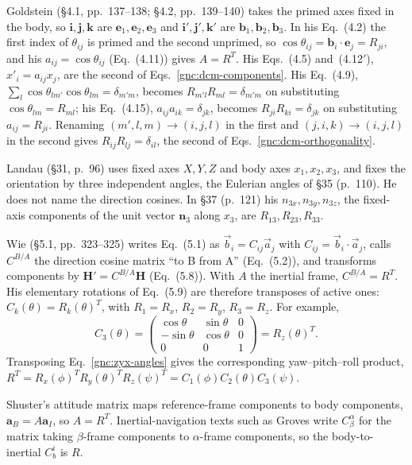 Goldstein (\S4.1, pp.~137--138; \S4.2, pp.~139--140) takes the primed
axes fixed in the body, so $\mathbf i,\mathbf j,\mathbf k$ are
$\mathbf e_1,\mathbf e_2,\mathbf e_3$ and $\mathbf i',\mathbf j',\mathbf k'$
are $\mathbf b_1,\mathbf b_2,\mathbf b_3$. In his Eq.~(4.2) the first index
of $\theta_{ij}$ is primed and the second unprimed, so
$\cos\theta_{ij}=\mathbf b_i\cdot\mathbf e_j=R_{ji}$, and his
$a_{ij}=\cos\theta_{ij}$ (Eq.~(4.11)) gives $A=R^T$. His
Eqs.~(4.5) and~(4.12$'$), $x'_i=a_{ij}x_j$, are the second of
Eqs.~\eqref{gnc:dcm-components}. His Eq.~(4.9),
$\sum_l\cos\theta_{lm'}\cos\theta_{lm}=\delta_{m'm}$, becomes
$R_{m'l}R_{ml}=\delta_{m'm}$ on substituting $\cos\theta_{lm}=R_{ml}$; his
Eq.~(4.15), $a_{ij}a_{ik}=\delta_{jk}$, becomes
$R_{ji}R_{ki}=\delta_{jk}$ on substituting $a_{ij}=R_{ji}$. Renaming
$(m',l,m)\to(i,j,l)$ in the first and $(j,i,k)\to(i,j,l)$ in the second
gives $R_{ij}R_{lj}=\delta_{il}$, the second of
Eqs.~\eqref{gnc:dcm-orthogonality}.

Landau (\S31, p.~96) uses fixed axes $X,Y,Z$ and body axes $x_1,x_2,x_3$,
and fixes the orientation by three independent angles, the Eulerian
angles of \S35 (p.~110). He does not name the direction cosines. In \S37
(p.~121) his $n_{3x},n_{3y},n_{3z}$, the fixed-axis components of the unit
vector $\mathbf n_3$ along $x_3$, are $R_{13},R_{23},R_{33}$.

Wie (\S5.1, pp.~323--325) writes Eq.~(5.1) as $\vec b_i=C_{ij}\vec a_j$
with $C_{ij}=\vec b_i\cdot\vec a_j$, calls $C^{B/A}$ the direction cosine
matrix ``to B from A'' (Eq.~(5.2)), and transforms components by
$\mathbf H'=C^{B/A}\mathbf H$ (Eq.~(5.8)). With $A$ the inertial frame,
$C^{B/A}=R^T$. His elementary rotations of Eq.~(5.9) are therefore
transposes of active ones: $C_k(\theta)=R_k(\theta)^T$, with
$R_1=R_x$, $R_2=R_y$, $R_3=R_z$. For example,
\[
 C_3(\theta)=
 \begin{pmatrix}\cos\theta&\sin\theta&0\\-\sin\theta&\cos\theta&0\\0&0&1
 \end{pmatrix}
 =R_z(\theta)^T .
\]
Transposing Eq.~\eqref{gnc:zyx-angles} gives the corresponding
yaw--pitch--roll product,
$R^T=R_x(\phi)^TR_y(\theta)^TR_z(\psi)^T=C_1(\phi)C_2(\theta)C_3(\psi)$.

Shuster's attitude matrix maps reference-frame components to body
components, $\mathbf a_B=A\mathbf a_I$, so $A=R^T$. Inertial-navigation
texts such as Groves write $C^\alpha_\beta$ for the matrix taking
$\beta$-frame components to $\alpha$-frame components, so the
body-to-inertial $C^i_b$ is $R$.

